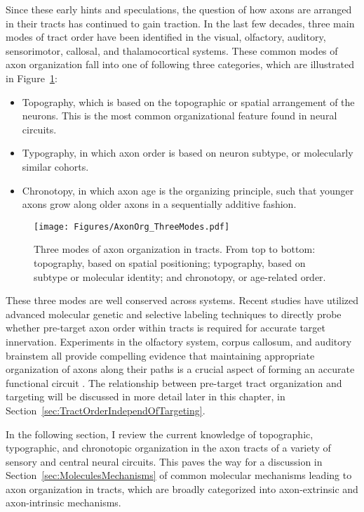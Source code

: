 Since these early hints and speculations, the question of how axons are arranged in their tracts has continued to gain traction.
In the last few decades, three main modes of tract order have been identified in the visual, olfactory, auditory, sensorimotor, callosal, and thalamocortical systems.
These common modes of axon organization fall into one of following three categories, which are illustrated in Figure~\ref{AxonOrgThreeModes}:
\begin{itemize}
\item Topography, which is based on the topographic or spatial arrangement of the neurons.
This is the most common organizational feature found in neural circuits.
\item Typography, in which axon order is based on neuron subtype, or molecularly similar cohorts.
\item Chronotopy, in which axon age is the organizing principle, such that younger axons grow along older axons in a sequentially additive fashion.
\end{itemize}
\begin{figure}[hbtp]
    \begin{center}
    \texttt{[image: Figures/AxonOrg\_ThreeModes.pdf]}
    \caption[Three modes of axon organization in tracts.]
    {Three modes of axon organization in tracts.
    From top to bottom: topography, based on spatial positioning; typography, based on subtype or molecular identity; and chronotopy, or age-related order.
    \label{AxonOrgThreeModes}}
    \end{center}
\end{figure}
These three modes are well conserved across systems.
Recent studies have utilized advanced molecular genetic and selective labeling techniques to directly probe whether pre-target axon order within tracts is required for accurate target innervation.
Experiments in the olfactory system, corpus callosum, and auditory brainstem all provide compelling evidence that maintaining appropriate organization of axons along their paths is a crucial aspect of forming an accurate functional circuit \cite{imai2009pre,zhou2013axon,michalski2013robo3}.
The relationship between pre-target tract organization and targeting will be discussed in more detail later in this chapter, in Section~\ref{sec:TractOrderIndependOfTargeting}.

In the following section, I review the current knowledge of topographic, typographic, and chronotopic organization in the axon tracts of a variety of sensory and central neural circuits.
This paves the way for a discussion in Section~\ref{sec:MoleculesMechanisms} of common molecular mechanisms leading to axon organization in tracts, which are broadly categorized into axon-extrinsic and axon-intrinsic mechanisms.